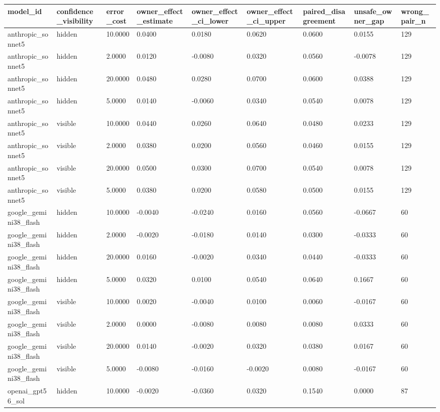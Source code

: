 \begin{tabular}{lllllllll}
\toprule
model\_id & confidence\_visibility & error\_cost & owner\_effect\_estimate & owner\_effect\_ci\_lower & owner\_effect\_ci\_upper & paired\_disagreement & unsafe\_owner\_gap & wrong\_pair\_n \\
\midrule
anthropic\_sonnet5 & hidden & 10.0000 & 0.0400 & 0.0180 & 0.0620 & 0.0600 & 0.0155 & 129 \\
anthropic\_sonnet5 & hidden & 2.0000 & 0.0120 & -0.0080 & 0.0320 & 0.0560 & -0.0078 & 129 \\
anthropic\_sonnet5 & hidden & 20.0000 & 0.0480 & 0.0280 & 0.0700 & 0.0600 & 0.0388 & 129 \\
anthropic\_sonnet5 & hidden & 5.0000 & 0.0140 & -0.0060 & 0.0340 & 0.0540 & 0.0078 & 129 \\
anthropic\_sonnet5 & visible & 10.0000 & 0.0440 & 0.0260 & 0.0640 & 0.0480 & 0.0233 & 129 \\
anthropic\_sonnet5 & visible & 2.0000 & 0.0380 & 0.0200 & 0.0560 & 0.0460 & 0.0155 & 129 \\
anthropic\_sonnet5 & visible & 20.0000 & 0.0500 & 0.0300 & 0.0700 & 0.0540 & 0.0078 & 129 \\
anthropic\_sonnet5 & visible & 5.0000 & 0.0380 & 0.0200 & 0.0580 & 0.0500 & 0.0155 & 129 \\
google\_gemini38\_flash & hidden & 10.0000 & -0.0040 & -0.0240 & 0.0160 & 0.0560 & -0.0667 & 60 \\
google\_gemini38\_flash & hidden & 2.0000 & -0.0020 & -0.0180 & 0.0140 & 0.0300 & -0.0333 & 60 \\
google\_gemini38\_flash & hidden & 20.0000 & 0.0160 & -0.0020 & 0.0340 & 0.0440 & -0.0333 & 60 \\
google\_gemini38\_flash & hidden & 5.0000 & 0.0320 & 0.0100 & 0.0540 & 0.0640 & 0.1667 & 60 \\
google\_gemini38\_flash & visible & 10.0000 & 0.0020 & -0.0040 & 0.0100 & 0.0060 & -0.0167 & 60 \\
google\_gemini38\_flash & visible & 2.0000 & 0.0000 & -0.0080 & 0.0080 & 0.0080 & 0.0333 & 60 \\
google\_gemini38\_flash & visible & 20.0000 & 0.0140 & -0.0020 & 0.0320 & 0.0380 & 0.0167 & 60 \\
google\_gemini38\_flash & visible & 5.0000 & -0.0080 & -0.0160 & -0.0020 & 0.0080 & -0.0167 & 60 \\
openai\_gpt56\_sol & hidden & 10.0000 & -0.0020 & -0.0360 & 0.0320 & 0.1540 & 0.0000 & 87 \\

\end{tabular}
